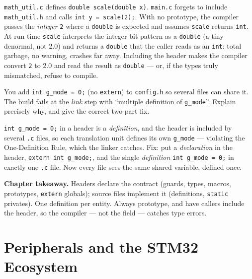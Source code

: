 \documentclass[11pt,a4paper,oneside]{book}
\newcommand{\code}[1]{\texttt{#1}}
\begin{document}
\begin{wexample}
\code{math\_util.c} defines \code{double scale(double x)}. \code{main.c} forgets
to include \code{math\_util.h} and calls \code{int y = scale(2);}. With no
prototype, the compiler passes the \emph{integer} \code{2} where a \code{double}
is expected and assumes \code{scale} returns \code{int}. At run time \code{scale}
interprets the integer bit pattern as a \code{double} (a tiny denormal, not
\num{2.0}) and returns a \code{double} that the caller reads as an \code{int}:
total garbage, no warning, crashes far away. Including the header makes the
compiler convert \code{2} to \num{2.0} and read the result as \code{double} ---
or, if the types truly mismatched, refuse to compile.
\end{wexample}

\begin{exercise}
You add \code{int g\_mode = 0;} (no \code{extern}) to \code{config.h} so several
files can share it. The build fails at the \emph{link} step with ``multiple
definition of \code{g\_mode}''. Explain precisely why, and give the correct
two-part fix.
\end{exercise}
\begin{solution}
\code{int g\_mode = 0;} in a header is a \emph{definition}, and the header is
included by several \code{.c} files, so each translation unit defines its own
\code{g\_mode} --- violating the One-Definition Rule, which the linker catches.
Fix: put a \emph{declaration} in the header, \code{extern int g\_mode;}, and the
single \emph{definition} \code{int g\_mode = 0;} in exactly one \code{.c} file.
Now every file sees the same shared variable, defined once.
\end{solution}

\begin{keyidea}
\textbf{Chapter takeaway.} Headers declare the contract (guards, types, macros,
prototypes, \code{extern} globals); source files implement it (definitions,
\code{static} privates). One definition per entity. Always prototype, and have
callers include the header, so the compiler --- not the field --- catches type
errors.
\end{keyidea}

\part{Peripherals and the STM32 Ecosystem}
\end{document}
